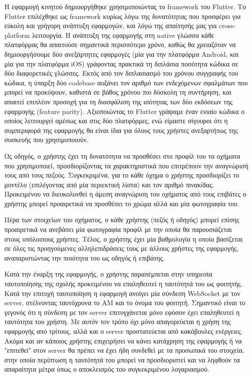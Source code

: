 \documentclass[../thesis.tex]{subfiles}
\begin{document}
Η εφαρμογή κινητού δημιουργήθηκε χρησιμοποιώντας το framework του Flutter.
Το Flutter επιλέχθηκε ως framework κυρίως λόγω της δυνατότητας που προσφέρει για εύκολη και γρήγορη ανάπτυξη εφαρμογών, και λόγω της απαίτησής μας για cross-platform λειτουργία.
Η ανάπτυξη της εφαρμογής στη native γλώσσα κάθε πλατφόρμας θα απαιτούσε σημαντικά περισσότερο χρόνο, καθώς θα χρειαζόταν να δημιουργήσουμε δύο ανεξάρτητες εφαρμογές (μία για την πλατφόρμα Android, και μία για την πλατφόρμα iOS) γράφοντας πρακτικά τη διπλάσια ποσότητα κώδικα σε δύο διαφορετικές γλώσσες.
Εκτός από τον διπλασιασμό του χρόνου συγγραφής του κώδικα, η ύπαρξη δύο codebase αυξάνει τον αριθμό των ενδεχόμενων σφαλμάτων που μπορεί να προκύψουν, καθιστά σε βάθος χρόνου πιο δύσκολη τη συντήρηση, και απαιτεί επιπλέον προσοχή για τη διασφάλιση της ισότητας των δύο εκδόσεων της εφαρμογής (feature parity).
Αξιοποιώντας το Flutter γράψαμε έναν ενιαίο κώδικα ο οποίος λειτουργεί αμέσως και στις δύο πλατφόρμες, ενώ είμαστε σίγουροι ότι η συμπεριφορά της εφαρμογής θα είναι ίδια για όλους τους χρήστες ανεξαρτήτως της συσκευής που χρησιμοποιούν.

Ως οδηγός, ο χρήστης έχει τη δυνατότητα να προσθέσει στο προφίλ του τα οχήματα που χρησιμοποιεί, προσδιορίζοντας τα χαρακτηριστικά που επιτρέπουν την αναγνώρισή τους από τους πεζούς.
Συγκεκριμένα, για το κάθε όχημα ο χρήστης προσδιορίζει το μοντέλο (επιλέγοντας από μία περιεκτική λίστα) και τον αριθμό πινακίδας.
Προκειμένου να διευκολυνθεί η άμεση αναγνώριση του οχήματος από τους επιβάτες ο χρήστης μπορεί προαιρετικά να προσθέσει το χρώμα αλλά και μία φωτογραφία του.

Πέρα των στοιχείων του οχήματος, ο κάθε χρήστης (πεζός ή οδηγός) μπορεί επίσης προαιρετικά να ανεβάσει μία φωτογραφία προφίλ με την οποία θα παρουσιάζεται στους υπόλοιπους χρήστες.
Τέλος, ο χρήστης έχει μία βαθμολογία η οποία βασίζεται σε όλες τις προηγούμενες αλληλεπιδράσεις τους με άλλους χρήστες της εφαρμογής, αναπαριστώντας την ποιότητα του ως οδηγός ή επιβάτης.

Κατά την έναρξη της εφαρμογής, ο χρήστης παραπέμπεται στην υπηρεσία ταυτοποίησης της σχολής προκειμένου να επαληθευτεί η ταυτότητά του ως φοιτητής.
Κατά την επιτυχή ταυτοποίηση η εφαρμογή ανοίγει μία σύνδεση WebSocket με τον server, στέλνοντας ταυτόχρονα το ΑΜ και το όνομα του φοιτητή.
Σημαντικό είναι το γεγονός ότι η σύνδεση με τον server επιτυγχάνεται μόνο εφόσον έχει επαληθευτεί η ταυτότητα του χρήστη.
Με αυτόν τον τρόπο όχι μόνο απαγορεύεται η χρήση της εφαρμογής από τρίτους, αλλά και ο server προστατεύεται από κακόβουλες ενέργειες.
Ακόμα και αν κάποιος χρήστης επιχειρήσει να κάνει κατάχρηση της εφαρμογής ή να "επιτεθεί" στον server θα πρέπει να έχει ήδη συνδεθεί με τα προσωπικά του στοιχεία, στην οποία περίπτωση η ταυτότητά του μπορεί να προσδιοριστεί και να ληφθούν τα απαραίτητα μέτρα όπως ο αποκλεισμός του συγκεκριμένου λογαριασμού.
\end{document}
